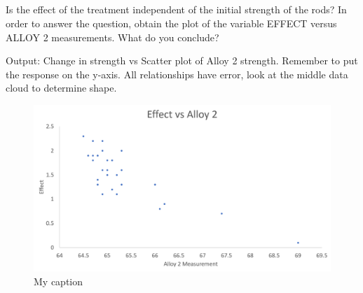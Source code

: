 \documentclass[letterpaper]{article}
\begin{document}
\subsection{}%
Is the effect of the treatment independent of the initial strength of the rods?
In order to answer the  question, obtain the plot of the variable EFFECT versus
ALLOY 2 measurements. What do you  conclude?

Output: Change in strength vs Scatter plot of Alloy 2 strength.
Remember to put the response on the y-axis. All relationships have
error, look at the middle data cloud to determine shape.

\begin{figure}[H]
 \centering
 \includegraphics[width=\textwidth]{q6.png}
 \caption{My caption}
 \label{q6}
\end{figure}
\end{document}
